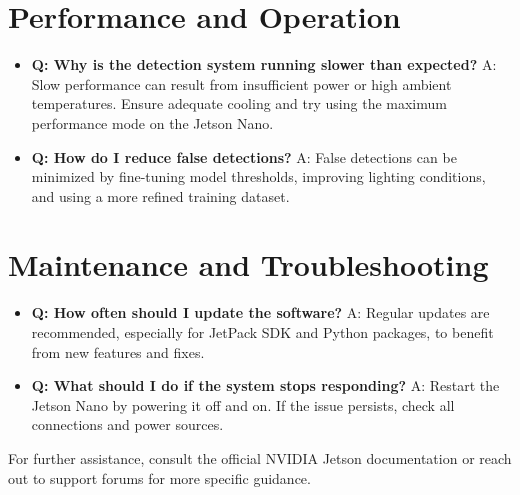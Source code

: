 \section{Performance and Operation}
\begin{itemize}[label=--, left=1.5em]
	\item \textbf{Q: Why is the detection system running slower than expected?}  
	A: Slow performance can result from insufficient power or high ambient temperatures. Ensure adequate cooling and try using the maximum performance mode on the Jetson Nano.
	
	\item \textbf{Q: How do I reduce false detections?}  
	A: False detections can be minimized by fine-tuning model thresholds, improving lighting conditions, and using a more refined training dataset.
\end{itemize}

\section{Maintenance and Troubleshooting}
\begin{itemize}[label=--, left=1.5em]
	\item \textbf{Q: How often should I update the software?}  
	A: Regular updates are recommended, especially for JetPack SDK and Python packages, to benefit from new features and fixes.
	
	\item \textbf{Q: What should I do if the system stops responding?}  
	A: Restart the Jetson Nano by powering it off and on. If the issue persists, check all connections and power sources.
\end{itemize}

For further assistance, consult the official NVIDIA Jetson documentation or reach out to support forums for more specific guidance.



